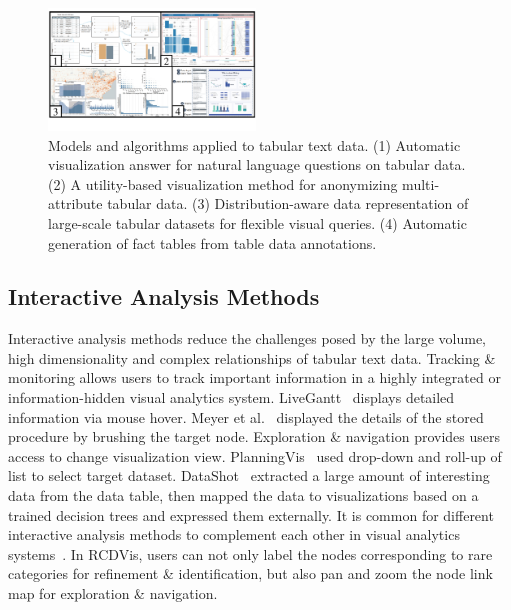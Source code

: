 \documentclass[a4paper,fleqn]{cas-dc}
\begin{document}
\begin{figure}[pos=h]
	\centering
	\includegraphics[width=0.49\textwidth]{Images/tabulartextdata2.pdf}
	\vspace{-3em}
	\caption{Models and algorithms applied to tabular text data. (1) Automatic visualization answer for natural language questions on tabular data. (2) A utility-based visualization method for anonymizing multi-attribute tabular data. (3) Distribution-aware data representation of large-scale tabular datasets for flexible visual queries. (4) Automatic generation of fact tables from table data annotations. }
	\label{fig:tabulartextdata2}
	\vspace{-1.5em}
\end{figure}

\subsection{Interactive Analysis Methods}
Interactive analysis methods reduce the challenges posed by the large volume, high dimensionality and complex relationships of tabular text data.
Tracking \& monitoring allows users to track important information in a highly integrated or information-hidden visual analytics system.
LiveGantt~\cite{Jo2014} displays detailed information via mouse hover. Meyer et al.~\cite{Meyer2013} displayed the details of the stored procedure by brushing the target node.
Exploration \& navigation provides users access to change visualization view. PlanningVis~\cite{sun2019planningvis} used drop-down and roll-up of list to select target dataset.
DataShot~\cite{wang2019datashot} extracted a large amount of interesting data from the data table, then mapped the data to visualizations based on a trained decision trees and expressed them externally.
It is common for different interactive analysis methods to complement each other in visual analytics systems~\cite{Qian2022,sun2019planningvis,Fellow2017}.
In RCDVis, users can not only label the nodes corresponding to rare categories for refinement \& identification, but also pan and zoom the node link map for exploration \& navigation.
\end{document}
